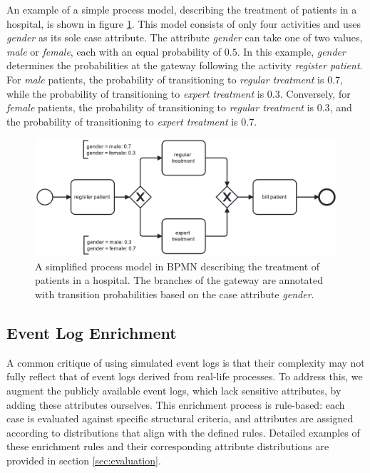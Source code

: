 An example of a simple process model, describing the treatment of patients in a hospital, is shown in figure \ref{fig:showcase}.
This model consists of only four activities and uses \textit{gender} as its sole case attribute.
The attribute \textit{gender} can take one of two values, \textit{male} or \textit{female}, each with an equal probability of $0.5$.
In this example, \textit{gender} determines the probabilities at the gateway following the activity \textit{register patient}.
For \textit{male} patients, the probability of transitioning to \textit{regular treatment} is $0.7$,
while the probability of transitioning to \textit{expert treatment} is $0.3$.
Conversely, for \textit{female} patients, the probability of transitioning to \textit{regular treatment} is $0.3$,
and the probability of transitioning to \textit{expert treatment} is $0.7$.

\begin{figure}[h!]
    \centering
    \includegraphics[width=\textwidth]{gfx/showcase.png}
    \caption{A simplified process model in BPMN describing the treatment of patients in a hospital.
    The branches of the gateway are annotated with transition probabilities based on the case attribute \textit{gender}.}
    \label{fig:showcase}
\end{figure}


\subsection{Event Log Enrichment}
A common critique of using simulated event logs
is that their complexity may not fully reflect that of event logs derived from real-life processes.
To address this, we augment the publicly available event logs, which lack sensitive attributes,
by adding these attributes ourselves.
This enrichment process is rule-based:
each case is evaluated against specific structural criteria,
and attributes are assigned according to distributions that align with the defined rules.
Detailed examples of these enrichment rules
and their corresponding attribute distributions are provided in section \ref{sec:evaluation}.

